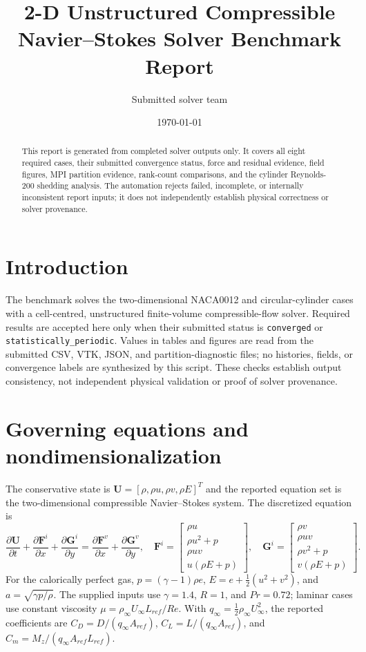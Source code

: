 \documentclass[11pt]{article}
\title{2-D Unstructured Compressible Navier--Stokes Solver Benchmark Report}
\author{Submitted solver team}
\date{\today}
\begin{document}
\maketitle
\begin{abstract}
This report is generated from completed solver outputs only.  It covers all eight required cases, their submitted convergence status, force and residual evidence, field figures, MPI partition evidence, rank-count comparisons, and the cylinder Reynolds-200 shedding analysis.  The automation rejects failed, incomplete, or internally inconsistent report inputs; it does not independently establish physical correctness or solver provenance.
\end{abstract}
\section{Introduction}
The benchmark solves the two-dimensional NACA0012 and circular-cylinder cases with a cell-centred, unstructured finite-volume compressible-flow solver.  Required results are accepted here only when their submitted status is \texttt{converged} or \texttt{statistically\_periodic}.  Values in tables and figures are read from the submitted CSV, VTK, JSON, and partition-diagnostic files; no histories, fields, or convergence labels are synthesized by this script.  These checks establish output consistency, not independent physical validation or proof of solver provenance.
\section{Governing equations and nondimensionalization}
The conservative state is $\mathbf U=[\rho,\rho u,\rho v,\rho E]^T$ and the reported equation set is the two-dimensional compressible Navier--Stokes system.  The discretized equation is
\[
\frac{\partial\mathbf U}{\partial t}+\frac{\partial\mathbf F^i}{\partial x}+\frac{\partial\mathbf G^i}{\partial y}=\frac{\partial\mathbf F^v}{\partial x}+\frac{\partial\mathbf G^v}{\partial y},
\quad
\mathbf F^i=\begin{bmatrix}\rho u\\\rho u^2+p\\\rho uv\\u(\rho E+p)\end{bmatrix},\quad
\mathbf G^i=\begin{bmatrix}\rho v\\\rho uv\\\rho v^2+p\\v(\rho E+p)\end{bmatrix}.
\]
For the calorically perfect gas, $p=(\gamma-1)\rho e$, $E=e+\tfrac12(u^2+v^2)$, and $a=\sqrt{\gamma p/\rho}$.  The supplied inputs use $\gamma=1.4$, $R=1$, and $Pr=0.72$; laminar cases use constant viscosity $\mu=\rho_\infty U_\infty L_{ref}/Re$.  With $q_\infty=\tfrac12\rho_\infty U_\infty^2$, the reported coefficients are $C_D=D/(q_\infty A_{ref})$, $C_L=L/(q_\infty A_{ref})$, and $C_m=M_z/(q_\infty A_{ref}L_{ref})$.
\end{document}
